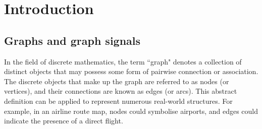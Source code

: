 


\pagestyle{fancy} %


\chapter{Introduction} %

\label{chap:ntroduction} %



\section{Graphs and graph signals}

In the field of discrete mathematics, the term ``graph" denotes a collection of distinct objects that may possess some form of pairwise connection or association. The discrete objects that make up the graph are referred to as nodes (or vertices), and their connections are known as edges (or arcs). This abstract definition can be applied to represent numerous real-world structures. For example, in an airline route map, nodes could symbolise airports, and edges could indicate the presence of a direct flight.


